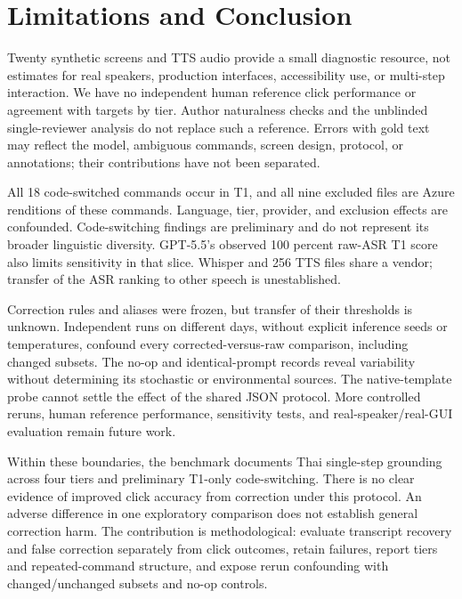 \section{Limitations and Conclusion}

Twenty synthetic screens and TTS audio provide a small diagnostic resource, not estimates for real speakers, production interfaces, accessibility use, or multi-step interaction. We have no independent human reference click performance or agreement with targets by tier. Author naturalness checks and the unblinded single-reviewer analysis do not replace such a reference. Errors with gold text may reflect the model, ambiguous commands, screen design, protocol, or annotations; their contributions have not been separated.

All 18 code-switched commands occur in T1, and all nine excluded files are Azure renditions of these commands. Language, tier, provider, and exclusion effects are confounded. Code-switching findings are preliminary and do not represent its broader linguistic diversity. GPT-5.5's observed 100 percent raw-ASR T1 score also limits sensitivity in that slice. Whisper and 256 TTS files share a vendor; transfer of the ASR ranking to other speech is unestablished.

Correction rules and aliases were frozen, but transfer of their thresholds is unknown. Independent runs on different days, without explicit inference seeds or temperatures, confound every corrected-versus-raw comparison, including changed subsets. The no-op and identical-prompt records reveal variability without determining its stochastic or environmental sources. The native-template probe cannot settle the effect of the shared JSON protocol. More controlled reruns, human reference performance, sensitivity tests, and real-speaker/real-GUI evaluation remain future work.

Within these boundaries, the benchmark documents Thai single-step grounding across four tiers and preliminary T1-only code-switching. There is no clear evidence of improved click accuracy from correction under this protocol. An adverse difference in one exploratory comparison does not establish general correction harm. The contribution is methodological: evaluate transcript recovery and false correction separately from click outcomes, retain failures, report tiers and repeated-command structure, and expose rerun confounding with changed/unchanged subsets and no-op controls.
